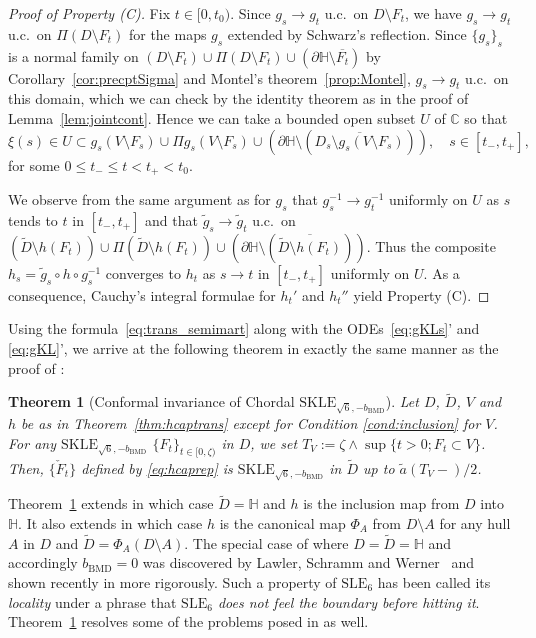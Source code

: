 \documentclass[preprint,12pt]{elsarticle}
\newtheorem{thm}{Theorem}[section]
\theoremstyle{definition}
\newcommand{\C}{\mathbb{C}}
\newcommand{\sle}{\mathrm{SLE}}
\newcommand{\skle}{\mathrm{SKLE}}
\newcommand{\bmd}{\mathrm{BMD}}
\newcommand{\uhp}{\mathbb{H}}
\begin{document}
\begin{proof}[Proof of Property \rm{(C)}]
Fix $t \in [0, t_0)$.
Since $g_s \to g_t$ u.c.\ on $D \setminus F_t$,
we have $g_s \to g_t$ u.c.\ on $\Pi (D \setminus F_t)$
for the maps $g_s$ extended by Schwarz's reflection.
Since $\{g_s\}_s$ is a normal family on
$(D \setminus F_t) \cup\Pi (D \setminus F_t)
\cup (\partial \uhp \setminus \overline{F_t})$
by Corollary~\ref{cor:precptSigma} and Montel's theorem~\ref{prop:Montel},
$g_s \to g_t$ u.c.\ on this domain,
which we can check by the identity theorem
as in the proof of Lemma~\ref{lem:jointcont}.
Hence we can take a bounded open subset $U$ of $\C$ so that
\[
\xi(s) \in U \subset g_s(V \setminus F_s) \cup \Pi g_s(V \setminus F_s) \cup
\left(\partial \uhp \setminus (\overline{D_s \setminus g_s(V \setminus F_s)})\right),
\quad s \in [t_-, t_+],
\]
for some $0 \leq t_- \leq t < t_+ <t_0$.

We observe from the same argument as for $g_s$ that
$g_s^{-1} \to g_t^{-1}$ uniformly on $U$ as $s$ tends to $t$ in $[t_-, t_+]$
and that $\tilde{g}_s \to \tilde{g}_t$ u.c.\ on
$(\tilde{D} \setminus h(F_t)) \cup \Pi(\tilde{D} \setminus h(F_t))
\cup \left( \partial \uhp \setminus (\overline{\tilde{D} \setminus h(F_t)}) \right)$.
Thus the composite $h_s=\tilde{g}_s \circ h \circ g_s^{-1}$
converges to $h_t$ as $s \to t$ in $[t_-, t_+]$ uniformly on $U$.
As a consequence, Cauchy's integral formulae for $h_t'$ and $h_t''$
yield Property (C).
\end{proof}

Using the formula~\eqref{eq:trans_semimart} along with the ODEs~\eqref{eq:gKLs}'
and \eqref{eq:gKL}',
we arrive at the following theorem in exactly the same manner as
the proof of \cite[Theorem~6.11]{CF18}:

\begin{thm}[Conformal invariance of Chordal $\skle_{\sqrt{6},-b_{\bmd}}$]
\label{cor:locality}
Let $D$, $\tilde{D}$, $V$ and $h$ be as in Theorem~\ref{thm:hcaptrans}
except for Condition \eqref{cond:inclusion} for $V$.
For any $\skle_{\sqrt{6}, -b_{\bmd}}$ $\{F_t\}_{t \in [0, \zeta)}$ in $D$,
we set $T_V:=\zeta \wedge \sup\{t>0; F_t \subset V\}$.
Then, $\{\check{F}_t\}$ defined by \eqref{eq:hcaprep} is
$\skle_{\sqrt{6}, -b_{\bmd}}$ in $\tilde{D}$ up to $\tilde{a}(T_V-)/2$.
\end{thm}

Theorem~\ref{cor:locality} extends \cite[Theorem~4.2]{CFS17}
in which case $\tilde{D}=\uhp$ and $h$ is the inclusion map from $D$ into $\uhp$.
It also extends \cite[Theorem~6.11]{CF18} in which case
$h$ is the canonical map $\Phi_A$ from $D \setminus A$ for any hull $A$ in $D$
and $\tilde{D}=\Phi_A(D \setminus A)$.
The special case of \cite[Theorem~6.11]{CF18} where $D=\tilde{D}=\uhp$
and accordingly $b_{\bmd}=0$ was discovered
by Lawler, Schramm and Werner~\cite{LSW01, LSW03} and shown recently
in \cite{CFS17} more rigorously.
Such a property of $\sle_6$ has been called its \emph{locality}
under a phrase that \emph{$\sle_6$ does not feel the boundary before hitting it}.
Theorem~\ref{cor:locality} resolves some of the problems posed
in \cite[Section~5]{CFS17} as well.
\end{document}
